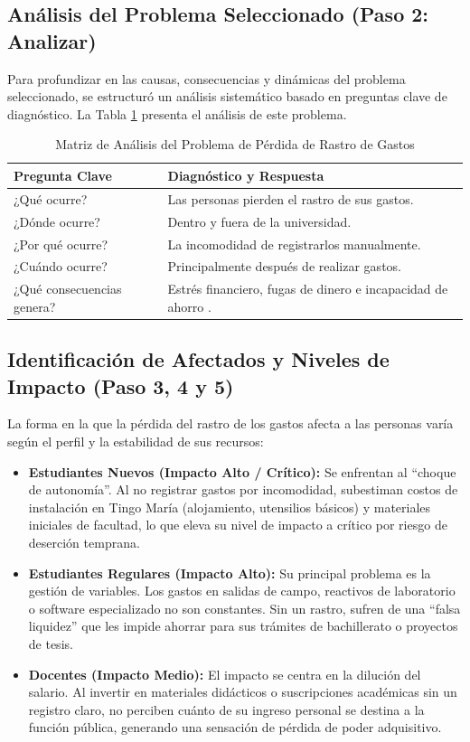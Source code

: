 \documentclass[12pt]{article}
\begin{document}
\subsection{Análisis del Problema Seleccionado (Paso 2: Analizar)}
Para profundizar en las causas, consecuencias y dinámicas del problema seleccionado, se estructuró un análisis sistemático basado en preguntas clave de diagnóstico. La Tabla \ref{tab:analisis_problema} presenta el análisis de este problema.

\begin{table}[H]
\centering
\caption{Matriz de Análisis del Problema de Pérdida de Rastro de Gastos}
\label{tab:analisis_problema}
\begin{tabular}{p{4.5cm}p{10.5cm}}
\toprule
\textbf{Pregunta Clave} & \textbf{Diagnóstico y Respuesta} \\
\midrule
¿Qué ocurre? & Las personas pierden el rastro de sus gastos. \\
¿Dónde ocurre? & Dentro y fuera de la universidad. \\
¿Por qué ocurre? & La incomodidad de registrarlos manualmente. \\
¿Cuándo ocurre? & Principalmente después de realizar gastos. \\
¿Qué consecuencias genera? & Estrés financiero, fugas de dinero e incapacidad de ahorro \cite{personalfinance2020}. \\
\bottomrule
\end{tabular}
\end{table}

\subsection{Identificación de Afectados y Niveles de Impacto (Paso 3, 4 y 5)}
La forma en la que la pérdida del rastro de los gastos afecta a las personas varía según el perfil y la estabilidad de sus recursos:
\begin{itemize}
    \item \textbf{Estudiantes Nuevos (Impacto Alto / Crítico):} Se enfrentan al ``choque de autonomía''. Al no registrar gastos por incomodidad, subestiman costos de instalación en Tingo María (alojamiento, utensilios básicos) y materiales iniciales de facultad, lo que eleva su nivel de impacto a crítico por riesgo de deserción temprana.
    \item \textbf{Estudiantes Regulares (Impacto Alto):} Su principal problema es la gestión de variables. Los gastos en salidas de campo, reactivos de laboratorio o software especializado no son constantes. Sin un rastro, sufren de una ``falsa liquidez'' que les impide ahorrar para sus trámites de bachillerato o proyectos de tesis.
    \item \textbf{Docentes (Impacto Medio):} El impacto se centra en la dilución del salario. Al invertir en materiales didácticos o suscripciones académicas sin un registro claro, no perciben cuánto de su ingreso personal se destina a la función pública, generando una sensación de pérdida de poder adquisitivo.
\end{itemize}
\end{document}

